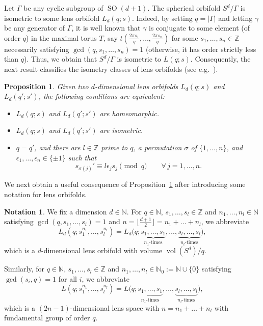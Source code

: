 \documentclass[12pt,a4paper,final]{amsart}
\theoremstyle{plain}
\newtheorem{proposition}[theorem]{Proposition}
\theoremstyle{definition}
\newtheorem{notation}[theorem]{Notation}
\theoremstyle{remark}
\numberwithin{equation}{section}
\newcommand{\N}{\mathbb N}
\newcommand{\Z}{\mathbb Z}
\DeclareMathOperator{\SO}{SO}
\DeclareMathOperator{\vol}{vol}
\begin{document}
Let $\Gamma$ be any cyclic subgroup of $\SO(d+1)$. 
The spherical orbifold $S^d/\Gamma$ is isometric to some lens orbifold $L_d(q;s)$. 
Indeed, by setting $q=|\Gamma|$ and letting $\gamma$ be any generator of $\Gamma$, it is well known that $\gamma$ is conjugate to some element (of order $q$) in the maximal torus $T$, say $t(\frac{2\pi s_1}{q}, \dots, \frac{2\pi s_n}{q})$ for some $s_1,\dots,s_n\in\Z$ necessarily satisfying $\gcd(q,s_1,\dots,s_n)=1$ (otherwise, it has order strictly less than $q$). 
Thus, we obtain that $S^d/\Gamma$ is isometric to $L(q;s)$.  
Consequently, the next result classifies the isometry classes of lens orbifolds (see e.g.\ \cite[Prop.~2.9]{Lauret-spec0cyclic}).




\begin{proposition}\label{prop:lensisometries}
Given two $d$-dimensional lens orbifolds $L_d(q;s)$ and $L_d(q';s')$, the following conditions are equivalent:
\begin{itemize}
\item $L_d(q;s)$ and $L_d(q';s')$ are homeomorphic. 

\item $L_d(q;s)$ and $L_d(q';s')$ are isometric. 

\item $q=q'$, and there are $l\in\Z$ prime to $q$, a permutation $\sigma$ of $\{1,\dots,n\}$, and $\epsilon_1,\dots,\epsilon_n\in\{\pm1\}$ such that 
\begin{equation}\label{eq:lensisometry}
s_{\sigma(j)}'\equiv l\epsilon_j s_j \pmod{q}\qquad\forall \,j=1,\dots,n .
\end{equation}
\end{itemize}
\end{proposition}




We next obtain a useful consequence of Proposition~\ref{prop:lensisometries} after introducing some notation for lens orbifolds. 
\begin{notation}\label{notation}
We fix a dimension $d\in\N$. 
For $q\in\N$, $s_1,\dots,s_l\in\Z$ and $n_1,\dots,n_l\in\N$ satisfying $\gcd(q,s_1,\dots,s_l)=1$ and $n=\lfloor\frac{d+1}{2}\rfloor=n_1+\dots+n_l$, we abbreviate 
$$
L_d(q;s_1^{n_1},\dots ,s_l^{n_l})
= L_d\big(q; 
\underbrace{s_1,\dots,s_1}_{\text{$n_1$-times}}
,\dots,
\underbrace{s_l,\dots,s_l}_{\text{$n_l$-times}}
\big)
,
$$ 
which is a $d$-dimensional lens orbifold with volume $\vol(S^d)/q$. 

Similarly, for $q\in\N$, $s_1,\dots,s_l\in\Z$ and $n_1,\dots,n_l\in\N_0:=\N\cup \{0\}$ satisfying $\gcd(s_i,q)=1$ for all $i$, we abbreviate 
$$
L(q;s_1^{n_1},\dots ,s_l^{n_l})
= L\big(q; 
\underbrace{s_1,\dots,s_1}_{\text{$n_1$-times}}
,\dots,
\underbrace{s_l,\dots,s_l}_{\text{$n_l$-times}}
\big)
,
$$ 
which is a $(2n-1)$-dimensional lens space with $n=n_1+\dots+n_l$ with fundamental group of order $q$. 
\end{notation}
\end{document}
